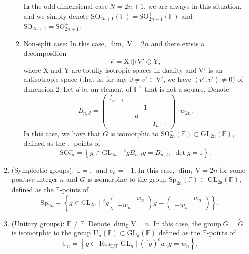 \documentclass[12pt, reqno]{amsart}
\theoremstyle{definition}
\theoremstyle{definition}
\theoremstyle{definition}
\newcommand{\multiplicativegroup}[1]{#1^{\times}}
\newcommand{\hermitianSpace}{\mathrm{V}}
\newcommand{\xIsotropic}{\mathrm{X}}
\newcommand{\yIsotropic}{\mathrm{Y}}
\newcommand{\innerproduct}[2]{\left\langle #1,#2\right\rangle}
\newcommand{\transpose}[1]{\, {}^{t}#1}
\newcommand{\involution}[1]{#1^{c}}
\newcommand{\IdentityMatrix}[1]{I_{#1}}
\newcommand{\GL}{\mathrm{GL}}
\newcommand{\SO}{\mathrm{SO}}
\newcommand{\Sp}{\mathrm{Sp}}
\newcommand{\UnitaryGroup}{\mathrm{U}}
\newcommand{\GroupExtension}[1]{\widetilde{#1}}
\newcommand{\finiteField}{\mathbb{F}}
\newcommand{\quadraticExtension}{\mathbb{E}}
\newcommand{\restrictionOfScalars}[3]{\operatorname{Res}_{#1 \slash #2}{#3}}
\newcommand{\algebraicGroup}[1]{\boldsymbol{\mathrm{#1}}}
\begin{document}
\begin{enumerate}
\begin{enumerate}
		In the odd-dimensional case $N = 2n+1$, we are always in this situation, and we simply denote $\SO_{2n+1}\left(\finiteField\right) = \SO_{2n+1}^{+}\left(\finiteField\right)$ and $\algebraicGroup{\SO}_{2n+1} = \algebraicGroup{\SO}_{2n+1}^{+}$.
		\item Non-split case: In this case, $\dim_{\finiteField} \hermitianSpace = 2n$ and there exists a decomposition $$\hermitianSpace = \xIsotropic \oplus \hermitianSpace' \oplus \yIsotropic,$$
		where $\xIsotropic$ and $\yIsotropic$ are totally isotropic spaces in duality and $\hermitianSpace'$ is an antisotropic space (that is, for any $0 \ne v' \in \hermitianSpace'$, we have $\innerproduct{v'}{v'} \ne 0$) of dimension 2. Let $d$ be an element of $\multiplicativegroup{\finiteField}$ that is not a square. Denote $$B_{n,d} = \begin{pmatrix}
			\IdentityMatrix{n-1}\\
			& & 1 &\\
			& -d & &\\
			& & & \IdentityMatrix{n-1}
		\end{pmatrix} \cdot w_{2n}.$$
		In this case, we have that $G$ is isomorphic to $\SO^{-}_{2n}\left(\finiteField\right) \subset  \GL_{2n}\left(\finiteField\right)$, defined as the $\finiteField$-points of $$\algebraicGroup{\SO}^{-}_{2n} = \left\{g \in \algebraicGroup{\GL}_{2n} \mid \transpose{g} B_{n,d} g = B_{n,d},\,\, \det g = 1\right\}.$$
	\end{enumerate}
	\item (Symplectic groups): $\quadraticExtension = \finiteField$ and $\epsilon_{\hermitianSpace} = -1$. In this case, $\dim_{\finiteField} \hermitianSpace = 2n$ for some positive integer $n$ and $G$ is isomorphic to the group $\Sp_{2n}\left(\finiteField\right) \subset  \GL_{2n}\left(\finiteField\right)$, defined as the $\finiteField$-points of $$\algebraicGroup{\Sp}_{2n} = \left\{g \in \algebraicGroup{\GL}_{2n} \mid \transpose{g} \begin{pmatrix}
		& w_n\\
		-w_n
	\end{pmatrix} g = \begin{pmatrix}
		& w_n\\
		-w_n
	\end{pmatrix}\right\}.$$
	\item (Unitary groups): $\quadraticExtension \ne \finiteField$. Denote $\dim_{\quadraticExtension} \hermitianSpace = n$. In this case, the group $G = \GroupExtension{G}$ is isomorphic to the group $\UnitaryGroup_n\left(\finiteField\right) \subset\GL_{n}\left(\quadraticExtension\right)$ defined as the $\finiteField$-points of $$\algebraicGroup{\UnitaryGroup}_n = \left\{ g \in \restrictionOfScalars{\quadraticExtension}{\finiteField}{\algebraicGroup{\GL}_n} \mid \involution{\left(\transpose{g}\right)} w_n g = w_n \right\}.$$
\end{enumerate}
\end{document}
